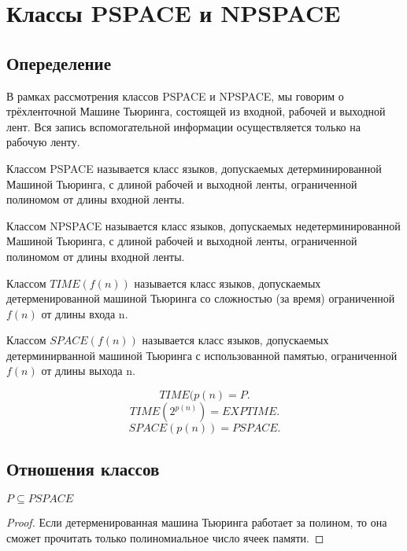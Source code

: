 \chapter{Классы PSPACE и NPSPACE}

\section{Опеределение}
В рамках рассмотрения классов PSPACE и NPSPACE, мы говорим о трёхленточной
Машине Тьюринга, состоящей из входной, рабочей и выходной лент. Вся запись
вспомогательной информации осуществляется только на рабочую ленту.
\begin{definition}
	Классом PSPACE называется класс языков, допускаемых детерминированной
	Машиной Тьюринга, с длиной рабочей и выходной ленты, ограниченной полиномом от
	длины входной ленты. 
\end{definition}

\begin{definition}
	Классом NPSPACE называется класс языков, допускаемых недетерминированной
	Машиной Тьюринга, с длиной рабочей и выходной ленты, ограниченной полиномом от
	длины входной ленты. 
\end{definition}

\begin{definition}
	Классом $TIME(f(n))$ называется класс языков, допускаемых
	детерменированной машиной Тьюринга со сложностью (за время) ограниченной
	$f(n)$ от длины входа n.
\end{definition}

\begin{definition}
	Классом $SPACE(f(n))$ называется класс языков, допускаемых
	детерминирванной машиной Тьюринга с использованной памятью, ограниченной
	$f(n)$ от длины выхода n.
\end{definition}
\[
	TIME(p(n) = P
.\] 
\[
	TIME(2^{p(n)}) = EXPTIME
.\] 
\[
	SPACE(p(n)) = PSPACE
.\] 

\section{Отношения классов}
\begin{proposition}
	$P \subseteq PSPACE$
\end{proposition}
\begin{proof}
	Если детерменированная машина Тьюринга работает за полином, то она
	сможет прочитать только полиномиальное число ячеек памяти.
\end{proof}


